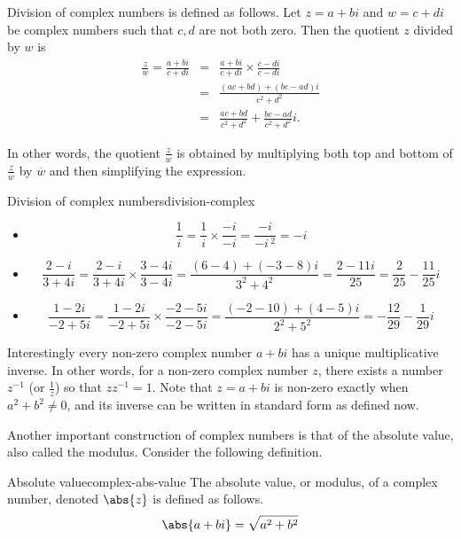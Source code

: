 Division of complex numbers is defined as follows. Let $z=a+bi$ and $w=c+di$ be complex numbers such that $c,d$ are not both zero. Then the quotient $z$ divided by $w$ is
\begin{eqnarray*}
  \frac{z}{w}=
  \frac{a+bi}{c+di} & = & \frac{a+bi}{c+di}\times \frac{c-di}{c-di} \\
                    & = & \frac{(ac+bd)+(bc-ad)i}{c^2+d^2} \\
                    & = & \frac{ac+bd}{c^2+d^2} +\frac{bc-ad}{c^2+d^2}i.
\end{eqnarray*}

In other words, the quotient $\frac{z}{w}$ is obtained by multiplying
both top and bottom of $\frac{z}{w}$ by $\overline{w}$ and
then simplifying the expression.

\begin{example}{Division of complex numbers}{division-complex}
  \begin{itemize}
  \item
    \[ \frac{1}{i} = \frac{1}{i}\times \frac{-i}{-i}
      =\frac{-i}{-i\,^2}=-i \]

  \item
    \[ \frac{2-i}{3+4i} = \frac{2-i}{3+4i}\times \frac{3-4i}{3-4i}
      =\frac{(6-4)+(-3-8)i}{3^2+4^2}
      =\frac{2-11i}{25}
      =\frac{2}{25} - \frac{11}{25}i \]

  \item

    \[ \frac{1-2i}{-2+5i} = \frac{1-2i}{-2+5i}\times \frac{-2-5i}{-2-5i}
      =\frac{(-2-10) + (4-5)i}{2^2+5^2}
      =-\frac{12}{29}-\frac{1}{29}i  \]
  \end{itemize}
\end{example}

Interestingly every non-zero complex number $a+bi$ has a unique
multiplicative inverse. In other words, for a non-zero complex number
$z$, there exists a number $z^{-1}$ (or $\frac{1}{z}$) so that
$zz^{-1} = 1$. Note that $z=a+bi$ is non-zero exactly when
$a^{2}+b^{2}\neq 0$, and its inverse can be written in standard form as defined now. 


Another important construction of complex numbers is that of the absolute value, also called the modulus. Consider the following definition. 

\begin{definition}{Absolute value}{complex-abs-value}
  The absolute
  value, or modulus, of a complex number, denoted $\abs{z}$ is defined as follows.
  \begin{equation*}
    \abs{a+bi} =
    \sqrt{a^{2}+b^{2}}
  \end{equation*}
\end{definition}

